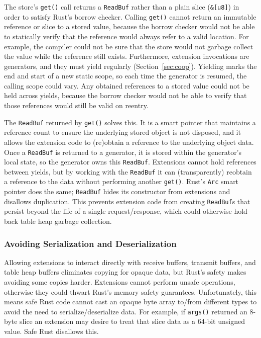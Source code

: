 The store's \texttt{get()} call returns a \texttt{ReadBuf} rather than a plain
  slice (\texttt{\&[u8]}) in order to satisfy Rust's borrow checker.
Calling \texttt{get()} cannot return an immutable reference or slice to a stored
  value, because the borrow checker would not be able to statically verify that the
  reference would always refer to a valid location.
For example, the compiler could not be sure that the store would not garbage
  collect the value while the reference still exists.
Furthermore, extension invocations are generators, and they must
  yield regularly (Section~\ref{sec:coop}).
Yielding marks the end and start of a new static scope, so
  each time the generator is resumed, the calling scope could vary.
Any obtained references to a stored value could not be held across yields,
  because the borrow checker would not be able to verify that those
  references would still be valid on reentry.

The \texttt{ReadBuf} returned by \texttt{get()} solves this.
It is a smart pointer that maintains a reference count to ensure
  the underlying stored object is not disposed, and it allows the extension code
  to (re)obtain a reference to the underlying object data.
Once a \texttt{ReadBuf} is returned to a generator, it is stored within the
  generator's local state, so the generator owns this \texttt{ReadBuf}.
Extensions cannot hold references between yields,
  but by working with the \texttt{ReadBuf} it can (transparently) reobtain a
  reference to the data without performing another \texttt{get()}.
Rust's \texttt{Arc} smart pointer does the same;
  \texttt{ReadBuf} hides its constructor from extensions and disallows duplication.
This prevents extension code from creating \texttt{ReadBuf}s that persist
  beyond the life of a single request/response, which could otherwise hold back
  table heap garbage collection.

\subsubsection{Avoiding Serialization and Deserialization}
\label{sec:ser-des}

Allowing extensions to interact directly with receive buffers, transmit buffers,
  and table heap buffers eliminates copying for opaque data, but Rust's safety
  makes avoiding some copies harder.
Extensions cannot perform unsafe operations, otherwise they could thwart Rust's
  memory safety guarantees.
Unfortunately, this means safe Rust code cannot cast an opaque byte array to/from
  different types to avoid the need to serialize/deserialize data.
For example, if \texttt{args()} returned an 8-byte slice an extension may desire
  to treat that slice data as a 64-bit unsigned value.
Safe Rust disallows this.

